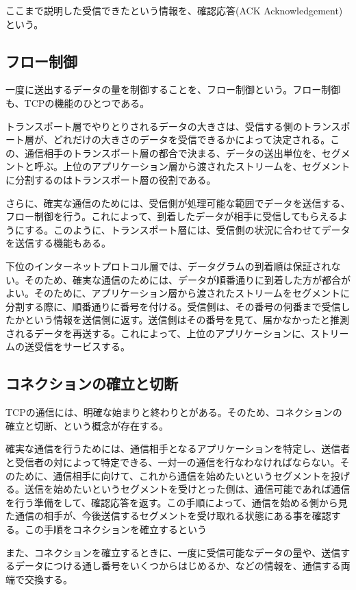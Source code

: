 ここまで説明した受信できたという情報を、確認応答(ACK Acknowledgement)という。

\subsection{フロー制御}

一度に送出するデータの量を制御することを、フロー制御という。フロー制御も、TCPの機能のひとつである。

トランスポート層でやりとりされるデータの大きさは、受信する側のトランスポート層が、どれだけの大きさのデータを受信できるかによって決定される。この、通信相手のトランスポート層の都合で決まる、データの送出単位を、セグメントと呼ぶ。上位のアプリケーション層から渡されたストリームを、セグメントに分割するのはトランスポート層の役割である。

さらに、確実な通信のためには、受信側が処理可能な範囲でデータを送信する、フロー制御を行う。これによって、到着したデータが相手に受信してもらえるようにする。このように、トランスポート層には、受信側の状況に合わせてデータを送信する機能もある。

下位のインターネットプロトコル層では、データグラムの到着順は保証されない。そのため、確実な通信のためには、データが順番通りに到着した方が都合がよい。そのために、アプリケーション層から渡されたストリームをセグメントに分割する際に、順番通りに番号を付ける。受信側は、その番号の何番まで受信したかという情報を送信側に返す。送信側はその番号を見て、届かなかったと推測されるデータを再送する。これによって、上位のアプリケーションに、ストリームの送受信をサービスする。


\subsection{コネクションの確立と切断}

TCPの通信には、明確な始まりと終わりとがある。そのため、コネクションの確立と切断、という概念が存在する。

確実な通信を行うためには、通信相手となるアプリケーションを特定し、送信者と受信者の対によって特定できる、一対一の通信を行なわなければならない。そのために、通信相手に向けて、これから通信を始めたいというセグメントを投げる。送信を始めたいというセグメントを受けとった側は、通信可能であれば通信を行う準備をして、確認応答を返す。この手順によって、通信を始める側から見た通信の相手が、今後送信するセグメントを受け取れる状態にある事を確認する。この手順をコネクションを確立するという

また、コネクションを確立するときに、一度に受信可能なデータの量や、送信するデータにつける通し番号をいくつからはじめるか、などの情報を、通信する両端で交換する。

